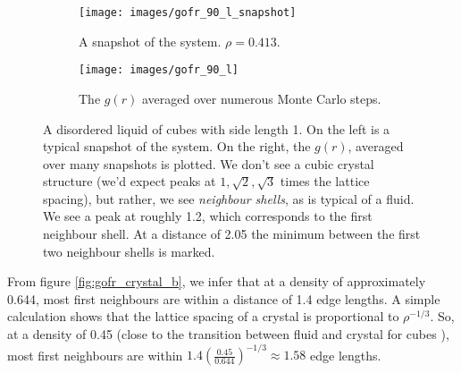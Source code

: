 \documentclass[thesis]{subfiles}
\begin{document}
\begin{figure}[H]
	\centering
	\vspace{-8pt}
\begin{subfigure}{0.3\textwidth}
	\centering
	\vspace{8pt}
	\texttt{[image: images/gofr\_90\_l\_snapshot]}
	\vspace{10pt}
	\caption{A snapshot of the system. $\rho = 0.413$.} 
\end{subfigure}
\begin{subfigure}{0.5\textwidth}
	\centering
	\texttt{[image: images/gofr\_90\_l]}
	\caption{The $g(r)$ averaged over numerous Monte Carlo steps.}
\end{subfigure}
\caption{A disordered liquid of cubes with side length 1. On the left is a typical snapshot of the system. On the right, the $g(r)$, averaged over many snapshots is plotted. We don't see a cubic crystal structure (we'd expect peaks at $1, \sqrt 2, \sqrt 3$ times the lattice spacing), but rather, we see \emph{neighbour shells}, as is typical of a fluid. We see a peak at roughly 1.2, which corresponds to the first neighbour shell. At a distance of 2.05 the minimum between the first two neighbour shells is marked.}
\end{figure}
From figure \ref{fig:gofr_crystal_b}, we infer that at a density of approximately 0.644, most first neighbours are within a distance of 1.4 edge lengths. A simple calculation shows  that the lattice spacing of a crystal is proportional to $\rho^{-1/3}$. So, at a density of 0.45 (close to the transition between fluid and crystal for cubes \cite{van2017phase}), most first neighbours are within $1.4 \left( \frac{0.45}{0.644}\right)^{-1/3} \approx 1.58$ edge lengths. 
\end{document}
